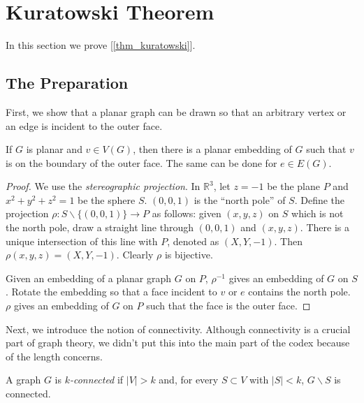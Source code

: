     \section{Kuratowski Theorem}
        In this section we prove [\ref{thm_kuratowski}].
        
    
    \subsection{The Preparation}
    
        First, we show that a planar graph can be drawn so that an arbitrary vertex or an edge is incident to the outer face.
    
        \begin{lemma} \label{lem_stereographic}
            If $G$ is planar and $v \in V(G)$, then there is a planar embedding of $G$ such that $v$ is on the boundary of the outer face. The same can be done for $e \in E(G)$.
        \end{lemma}
        
        \begin{proof}
            We use the \emph{stereographic projection}. In $\mathbb{R}^3$, let $z=-1$ be the plane $P$ and $x^2+y^2+z^2=1$ be the sphere $S$. $(0,0,1)$ is the ``north pole'' of $S$. Define the projection $\rho: S \backslash \{(0,0,1)\} \rightarrow P$ as follows: given $(x,y,z)$ on $S$ which is not the north pole, draw a straight line through $(0,0,1)$ and $(x,y,z)$. There is a unique intersection of this line with $P$, denoted as $(X,Y,-1)$. Then $\rho(x,y,z)=(X,Y,-1)$. Clearly $\rho$ is bijective.
            
            Given an embedding of a planar graph $G$ on $P$, $\rho^{-1}$ gives an embedding of $G$ on $S$. Rotate the embedding so that a face incident to $v$ or $e$ contains the north pole. $\rho$ gives an embedding of $G$ on $P$ such that the face is the outer face.
        \end{proof}
        
        Next, we introduce the notion of connectivity. Although connectivity is a crucial part of graph theory, we didn't put this into the main part of the codex because of the length concerns.
    
        \begin{defn}[Connectivity] \label{def_connectivity}
            A graph $G$ is \emph{$k$-connected} if $|V| > k$ and, for every $S \subset V$ with $|S| < k$, $G \backslash S$ is connected.
        \end{defn}
        

